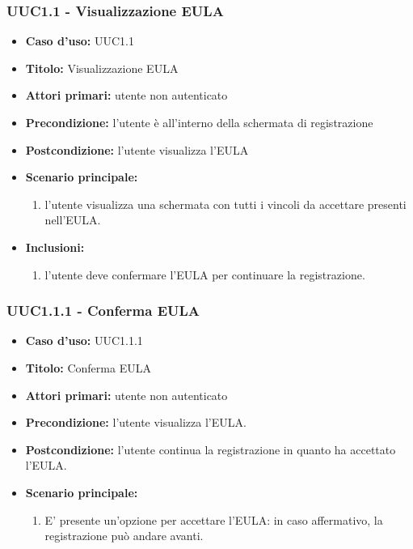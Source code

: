 \documentclass[casi-duso]{subfiles}
\begin{document}
\subsubsection{UUC1.1 - Visualizzazione EULA}%
\label{subsub:UUC1.1utente}
\begin{itemize}
  \item \textbf{Caso d’uso:} UUC1.1
  \item \textbf{Titolo:} Visualizzazione EULA
  \item \textbf{Attori primari:} utente non autenticato
  \item \textbf{Precondizione:} l'utente è all'interno della schermata di registrazione
  \item \textbf{Postcondizione:} l'utente visualizza l'EULA
  \item \textbf{Scenario principale:}
        \begin{enumerate}
          \item l'utente visualizza una schermata con tutti i vincoli da accettare presenti nell'EULA.
        \end{enumerate}
  \item \textbf{Inclusioni:}
        \begin{enumerate}
          \item l'utente deve confermare l'EULA per continuare la registrazione.
        \end{enumerate}
\end{itemize}

\subsubsection{UUC1.1.1 - Conferma EULA}%
\label{subsub:UUC1.1.1utente}
\begin{itemize}
  \item \textbf{Caso d’uso:} UUC1.1.1
  \item \textbf{Titolo:} Conferma EULA
  \item \textbf{Attori primari:} utente non autenticato
  \item \textbf{Precondizione:} l'utente visualizza l'EULA.
  \item \textbf{Postcondizione:} l'utente continua la registrazione in quanto ha accettato l'EULA.
  \item \textbf{Scenario principale:}
        \begin{enumerate}
          \item E' presente un'opzione per accettare l'EULA: in caso affermativo, la registrazione può andare avanti.
        \end{enumerate}
\end{itemize}
\end{document}
